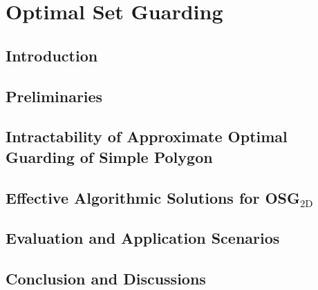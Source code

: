 
\chapter{Optimal Set Guarding}
\thispagestyle{myheadings}

\def\R{\mathbf{R}}
\def\C{\mathcal C}
\def\W{\mathcal W}

\def\opt{\textsc{OPT}\xspace}

\def\osgt{\textsc{OSG${}_{\mathrm{2D}}$}\xspace}

\def\opg{\textsc{OPG}\xspace}
\def\opgt{\textsc{OPG${}_{\mathrm{2D}}$}\xspace}
\def\orgt{\textsc{{ORG}${}_{\mathrm{2D}}$}\xspace}
\def\dopgt{\textsc{{D-OPG}${}_{\mathrm{2D}}$}\xspace}
\def\dorgt{\textsc{{D-ORG}${}_{\mathrm{2D}}$}\xspace}

\section{Introduction}\label{sec:osg-intro}


\section{Preliminaries}\label{sec:osg-problem}


\section{Intractability of Approximate Optimal Guarding of Simple Polygon}\label{sec:osg-complexity}


\section{Effective Algorithmic Solutions for \osgt}\label{sec:osg-algo}


\section{Evaluation and Application Scenarios}\label{sec:osg-expr}


\section{Conclusion and Discussions}\label{sec:osg-conc}
